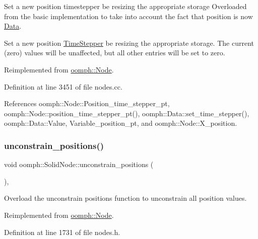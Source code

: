 Set a new position timestepper be resizing the appropriate storage Overloaded from the basic implementation to take into account the fact that position is now \hyperlink{classoomph_1_1Data}{Data}. 

Set a new position \hyperlink{classoomph_1_1TimeStepper}{Time\+Stepper} be resizing the appropriate storage. The current (zero) values will be unaffected, but all other entries will be set to zero. 

Reimplemented from \hyperlink{classoomph_1_1Node_a15d3962d66d92de44e32edc9c5c2fedf}{oomph\+::\+Node}.



Definition at line 3451 of file nodes.\+cc.



References oomph\+::\+Node\+::\+Position\+\_\+time\+\_\+stepper\+\_\+pt, oomph\+::\+Node\+::position\+\_\+time\+\_\+stepper\+\_\+pt(), oomph\+::\+Data\+::set\+\_\+time\+\_\+stepper(), oomph\+::\+Data\+::\+Value, Variable\+\_\+position\+\_\+pt, and oomph\+::\+Node\+::\+X\+\_\+position.

\mbox{\label{classoomph_1_1SolidNode_a1959abfbb37f775a4d6808ceb9afd421}} 
\subsubsection{\texorpdfstring{unconstrain\+\_\+positions()}{unconstrain\_positions()}}
{\footnotesize\ttfamily void oomph\+::\+Solid\+Node\+::unconstrain\+\_\+positions (\begin{DoxyParamCaption}{ }\end{DoxyParamCaption})\hspace{0.3cm}{\ttfamily [inline]}, {\ttfamily [virtual]}}



Overload the unconstrain positions function to unconstrain all position values. 



Reimplemented from \hyperlink{classoomph_1_1Node_ac23aaa36891269f3c9a832618f0c8c2c}{oomph\+::\+Node}.



Definition at line 1731 of file nodes.\+h.




